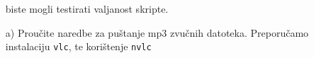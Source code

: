 \documentclass{exam}
\newcommand{\shell}[1]{\texttt{#1}}
\begin{document}
\begin{itemize}
                                                                                                                                         biste
                                                                                                                                         mogli
                                                                                                                                         testirati
                                                                                                                                         valjanost
                                                                                                                                         skripte.
                                                                                                                                            \item[a)]Proučite
                                                                                                                                            naredbe
                                                                                                                                            za
                                                                                                                                            puštanje
                                                                                                                                            mp3
                                                                                                                                            zvučnih
                                                                                                                                            datoteka.
                                                                                                                                            Preporučamo
                                                                                                                                            instalaciju
                                                                                                                                            \shell{vlc},
                                                                                                                                            te
                                                                                                                                            korištenje
                                                                                                                                            \shell{nvlc}

\end{itemize}
\end{document}
